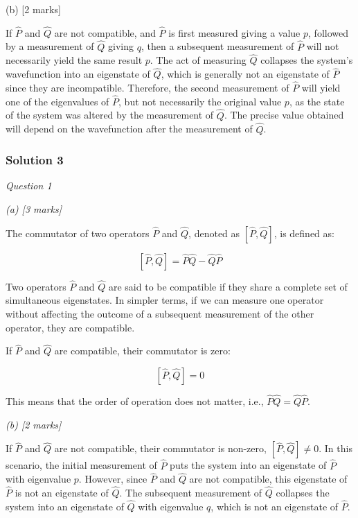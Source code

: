 \documentclass{article}
\begin{document}
\noindent (b) [2 marks]

\noindent If $\hat{P}$ and $\hat{Q}$ are not compatible, and $\hat{P}$ is first measured giving a value $p$, followed by a measurement of $\hat{Q}$ giving $q$, then a subsequent measurement of $\hat{P}$ will not necessarily yield the same result $p$.
\noindent The act of measuring $\hat{Q}$ collapses the system's wavefunction into an eigenstate of $\hat{Q}$, which is generally not an eigenstate of $\hat{P}$ since they are incompatible.
\noindent Therefore, the second measurement of $\hat{P}$ will yield one of the eigenvalues of $\hat{P}$, but not necessarily the original value $p$, as the state of the system was altered by the measurement of $\hat{Q}$. The precise value obtained will depend on the wavefunction after the measurement of $\hat{Q}$.


\subsubsection{Solution 3}
\textit{Question 1}

\textit{(a) [3 marks]}

The commutator of two operators $\hat{P}$ and $\hat{Q}$, denoted as $[\hat{P}, \hat{Q}]$, is defined as:

\[ [\hat{P}, \hat{Q}] = \hat{P}\hat{Q} - \hat{Q}\hat{P} \]

Two operators $\hat{P}$ and $\hat{Q}$ are said to be compatible if they share a complete set of simultaneous eigenstates. In simpler terms, if we can measure one operator without affecting the outcome of a subsequent measurement of the other operator, they are compatible.

If $\hat{P}$ and $\hat{Q}$ are compatible, their commutator is zero:

\[ [\hat{P}, \hat{Q}] = 0 \]

This means that the order of operation does not matter, i.e., $\hat{P}\hat{Q} = \hat{Q}\hat{P}$.

\textit{(b) [2 marks]}

If $\hat{P}$ and $\hat{Q}$ are not compatible, their commutator is non-zero, $[\hat{P}, \hat{Q}] \neq 0$. In this scenario, the initial measurement of $\hat{P}$ puts the system into an eigenstate of $\hat{P}$ with eigenvalue $p$.  However, since $\hat{P}$ and $\hat{Q}$ are not compatible, this eigenstate of $\hat{P}$ is not an eigenstate of $\hat{Q}$. The subsequent measurement of $\hat{Q}$ collapses the system into an eigenstate of $\hat{Q}$ with eigenvalue $q$, which is not an eigenstate of $\hat{P}$.
\end{document}
